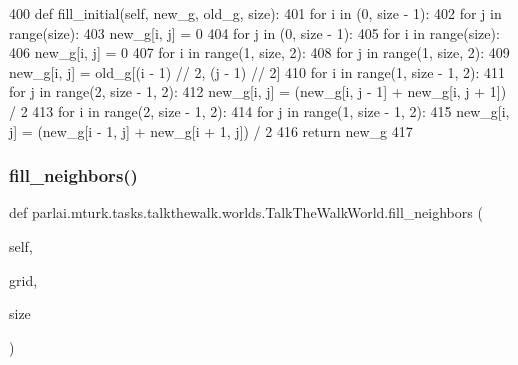 \begin{DoxyCode}
400     \textcolor{keyword}{def }fill\_initial(self, new\_g, old\_g, size):
401         \textcolor{keywordflow}{for} i \textcolor{keywordflow}{in} (0, size - 1):
402             \textcolor{keywordflow}{for} j \textcolor{keywordflow}{in} range(size):
403                 new\_g[i, j] = 0
404         \textcolor{keywordflow}{for} j \textcolor{keywordflow}{in} (0, size - 1):
405             \textcolor{keywordflow}{for} i \textcolor{keywordflow}{in} range(size):
406                 new\_g[i, j] = 0
407         \textcolor{keywordflow}{for} i \textcolor{keywordflow}{in} range(1, size, 2):
408             \textcolor{keywordflow}{for} j \textcolor{keywordflow}{in} range(1, size, 2):
409                 new\_g[i, j] = old\_g[(i - 1) // 2, (j - 1) // 2]
410         \textcolor{keywordflow}{for} i \textcolor{keywordflow}{in} range(1, size - 1, 2):
411             \textcolor{keywordflow}{for} j \textcolor{keywordflow}{in} range(2, size - 1, 2):
412                 new\_g[i, j] = (new\_g[i, j - 1] + new\_g[i, j + 1]) / 2
413         \textcolor{keywordflow}{for} i \textcolor{keywordflow}{in} range(2, size - 1, 2):
414             \textcolor{keywordflow}{for} j \textcolor{keywordflow}{in} range(1, size - 1, 2):
415                 new\_g[i, j] = (new\_g[i - 1, j] + new\_g[i + 1, j]) / 2
416         \textcolor{keywordflow}{return} new\_g
417 
\end{DoxyCode}
\mbox{\label{classparlai_1_1mturk_1_1tasks_1_1talkthewalk_1_1worlds_1_1TalkTheWalkWorld_a44d5136e6f6808929e818041011d8e71}} 
\subsubsection{\texorpdfstring{fill\+\_\+neighbors()}{fill\_neighbors()}}
{\footnotesize\ttfamily def parlai.\+mturk.\+tasks.\+talkthewalk.\+worlds.\+Talk\+The\+Walk\+World.\+fill\+\_\+neighbors (\begin{DoxyParamCaption}\item[{}]{self,  }\item[{}]{grid,  }\item[{}]{size }\end{DoxyParamCaption})}



